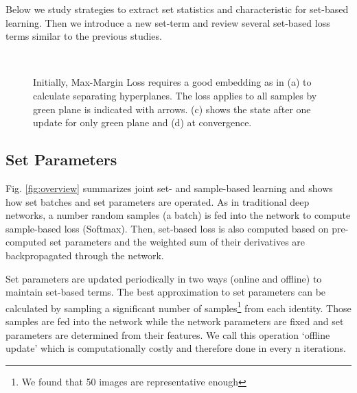 \documentclass[10pt,twocolumn,letterpaper]{article}
\newcommand{\margin}{Max-Margin Loss\xspace}
\begin{document}
Below we study strategies to extract set statistics and characteristic for set-based learning. Then we introduce a new set-term and review several set-based loss terms similar to the previous studies.

\begin{figure}[t]
\begin{center}

\hspace{0.1in}  
  \\
\hspace{0.1in}  
\end{center}
\caption{Initially, \margin requires a good embedding as in (a) to calculate separating hyperplanes. The loss applies to all samples by green plane is indicated with arrows. (c) shows the state after one update for only green plane and (d) at convergence. }
\label{fig:maxmargin}
\end{figure}

\subsection{Set Parameters}
\label{sec:setparams}
Fig. \ref{fig:overview} summarizes joint set- and sample-based learning and shows how set batches and set parameters are operated. As in traditional deep networks, a number random samples (a batch) is fed into the network to compute sample-based loss (\ie Softmax). Then, set-based loss is also computed based on pre-computed set parameters and the weighted sum of their derivatives are backpropagated through the network.

Set parameters are updated periodically in two ways (online and offline) to maintain set-based terms. The best approximation to set parameters can be calculated by sampling a significant number of samples\footnote{We found that 50 images are representative enough} from each identity. Those samples are fed into the network while the network parameters are fixed and set parameters are determined from their features. We call this operation `offline update' which is computationally costly and therefore done in every n iterations.
\end{document}
